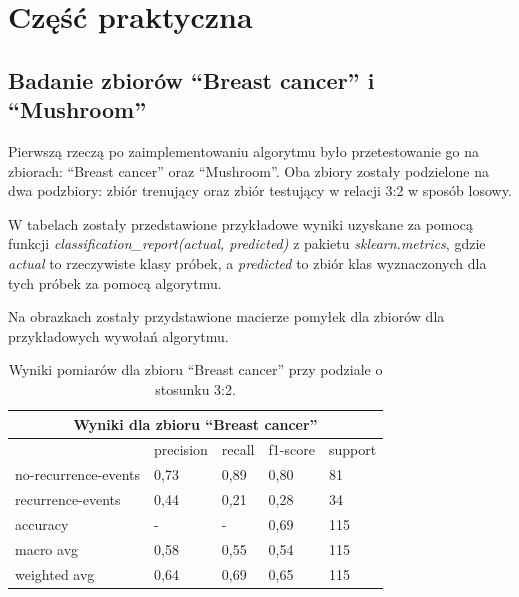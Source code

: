 \section{Część praktyczna}
\subsection{Badanie zbiorów ``Breast cancer'' i ``Mushroom''}
Pierwszą rzeczą po zaimplementowaniu algorytmu było przetestowanie go na
zbiorach: ``Breast cancer'' oraz ``Mushroom''. Oba zbiory zostały podzielone na
dwa podzbiory: zbiór trenujący oraz zbiór testujący w relacji 3:2 w sposób
losowy.

W tabelach zostały przedstawione przykładowe wyniki uzyskane za pomocą funkcji
\textit{classification_report(actual, predicted)} z pakietu
\textit{sklearn.metrics}, gdzie \textit{actual} to rzeczywiste klasy próbek, a
\textit{predicted} to zbiór klas wyznaczonych dla tych próbek za pomocą 
algorytmu.

Na obrazkach zostały przydstawione macierze pomyłek dla zbiorów dla
przykładowych wywołań algorytmu.

\begin{table}[h!]
        \centering
        \begin{tabular}{ |p{2cm}|p{2cm}|p{2cm}|p{2cm}|p{2cm}| }
                \hline
                \multicolumn{5}{|c|}{Wyniki dla zbioru ``Breast cancer''} \\
                \hline
                 & precision & recall & f1-score & support \\
                \hline
                no-recurrence-events & 0,73 & 0,89 & 0,80 & 81 \\
                \hline
                recurrence-events & 0,44 & 0,21 & 0,28 & 34 \\
                \hline
                accuracy & - & - & 0,69 & 115 \\
                \hline
                macro avg & 0,58 & 0,55 & 0,54 & 115 \\
                \hline
                weighted avg & 0,64 & 0,69 & 0,65 & 115 \\
                \hline
        \end{tabular}
        \caption{Wyniki pomiarów dla zbioru ``Breast cancer'' przy podziale o stosunku 3:2.}
\end{table}

